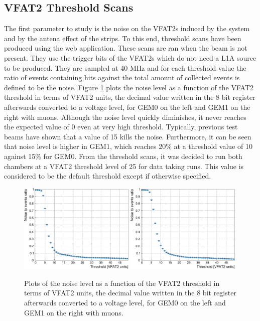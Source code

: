     \subsection{VFAT2 Threshold Scans}

      The first parameter to study is the noise on the VFAT2s induced by the system and by the antena effect of the strips. To this end, threshold scans have been produced using the web application. These scans are ran when the beam is not present. They use the trigger bits of the VFAT2s which do not need a L1A source to be produced. They are sampled at 40 MHz and for each threshold value the ratio of events containing hits against the total amount of collected events is defined to be the noise. Figure \ref{fig:II-3-data-threshold} plots the noise level as a function of the VFAT2 threshold in terms of VFAT2 units, the decimal value written in the 8 bit register afterwards converted to a voltage level, for GEM0 on the left and GEM1 on the right with muons. Although the noise level quickly diminishes, it never reaches the expected value of 0 even at very high threshold. Typically, previous test beams have shown that a value of 15 kills the noise. Furthermore, it can be seen that noise level is higher in GEM1, which reaches 20\% at a threshold value of 10 against 15\% for GEM0. From the threshold scans, it was decided to run both chambers at a VFAT2 threshold level of 25 for data taking runs. This value is considered to be the default threshold except if otherwise specified. \\

      \begin{figure}[h!]
        \centering
        \includegraphics[width=0.49\textwidth]{img/plots/cThresholdScan_GEM0-crop}
        \includegraphics[width=0.49\textwidth]{img/plots/cThresholdScan_GEM1-crop}
        \caption{Plots of the noise level as a function of the VFAT2 threshold in terms of VFAT2 units, the decimal value written in the 8 bit register afterwards converted to a voltage level, for GEM0 on the left and GEM1 on the right with muons.}
        \label{fig:II-3-data-threshold}
      \end{figure}

